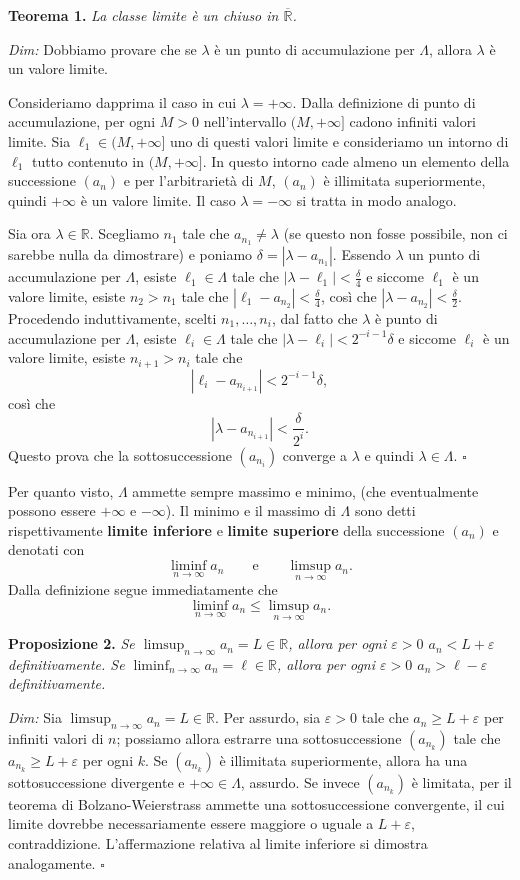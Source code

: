 \documentclass[11pt,a4paper]{article}
\newcommand{\R}{\mathbb{R}}
\newcommand{\Rbar}{\overline{\mathbb{R}}}
\newcommand{\result}[2]{\par\medskip\noindent\textbf{#1} \textit{#2}\par}
\newcommand{\proofit}{\par\medskip\noindent\textit{Dim:} }
\newcommand{\qedherecustom}{\hfill$\square$}
\begin{document}
\result{Teorema 1.}{La classe limite è un chiuso in $\Rbar$.}

\proofit Dobbiamo provare che se $\lambda$ è un punto di accumulazione per $\Lambda$, allora $\lambda$ è un valore limite.

Consideriamo dapprima il caso in cui $\lambda=+\infty$. Dalla definizione di punto di accumulazione, per ogni $M>0$ nell'intervallo $(M,+\infty]$ cadono infiniti valori limite. Sia $\ell_1\in(M,+\infty]$ uno di questi valori limite e consideriamo un intorno di $\ell_1$ tutto contenuto in $(M,+\infty]$. In questo intorno cade almeno un elemento della successione $(a_n)$ e per l'arbitrarietà di $M$, $(a_n)$ è illimitata superiormente, quindi $+\infty$ è un valore limite. Il caso $\lambda=-\infty$ si tratta in modo analogo.

Sia ora $\lambda\in\R$. Scegliamo $n_1$ tale che $a_{n_1}\neq\lambda$ (se questo non fosse possibile, non ci sarebbe nulla da dimostrare) e poniamo $\delta=|\lambda-a_{n_1}|$. Essendo $\lambda$ un punto di accumulazione per $\Lambda$, esiste $\ell_1\in\Lambda$ tale che $|\lambda-\ell_1|<\frac\delta4$ e siccome $\ell_1$ è un valore limite, esiste $n_2>n_1$ tale che $|\ell_1-a_{n_2}|<\frac\delta4$, così che $|\lambda-a_{n_2}|<\frac\delta2$. Procedendo induttivamente, scelti $n_1,\ldots,n_i$, dal fatto che $\lambda$ è punto di accumulazione per $\Lambda$, esiste $\ell_i\in\Lambda$ tale che $|\lambda-\ell_i|<2^{-i-1}\delta$ e siccome $\ell_i$ è un valore limite, esiste $n_{i+1}>n_i$ tale che
\[
|\ell_i-a_{n_{i+1}}|<2^{-i-1}\delta,
\]
così che
\[
|\lambda-a_{n_{i+1}}|<\frac{\delta}{2^i}.
\]
Questo prova che la sottosuccessione $(a_{n_i})$ converge a $\lambda$ e quindi $\lambda\in\Lambda$. \qedherecustom

Per quanto visto, $\Lambda$ ammette sempre massimo e minimo, (che eventualmente possono essere $+\infty$ e $-\infty$). Il minimo e il massimo di $\Lambda$ sono detti rispettivamente \textbf{limite inferiore} e \textbf{limite superiore} della successione $(a_n)$ e denotati con
\[
\liminf_{n\to\infty}a_n\qquad\text{e}\qquad\limsup_{n\to\infty}a_n.
\]
Dalla definizione segue immediatamente che
\[
\liminf_{n\to\infty}a_n\le\limsup_{n\to\infty}a_n.
\]

\result{Proposizione 2.}{Se $\limsup_{n\to\infty}a_n=L\in\R$, allora per ogni $\varepsilon>0$ $a_n<L+\varepsilon$ definitivamente. Se $\liminf_{n\to\infty}a_n=\ell\in\R$, allora per ogni $\varepsilon>0$ $a_n>\ell-\varepsilon$ definitivamente.}

\proofit Sia $\limsup_{n\to\infty}a_n=L\in\R$. Per assurdo, sia $\varepsilon>0$ tale che $a_n\ge L+\varepsilon$ per infiniti valori di $n$; possiamo allora estrarre una sottosuccessione $(a_{n_k})$ tale che $a_{n_k}\ge L+\varepsilon$ per ogni $k$. Se $(a_{n_k})$ è illimitata superiormente, allora ha una sottosuccessione divergente e $+\infty\in\Lambda$, assurdo. Se invece $(a_{n_k})$ è limitata, per il teorema di Bolzano-Weierstrass ammette una sottosuccessione convergente, il cui limite dovrebbe necessariamente essere maggiore o uguale a $L+\varepsilon$, contraddizione. L'affermazione relativa al limite inferiore si dimostra analogamente. \qedherecustom
\end{document}
